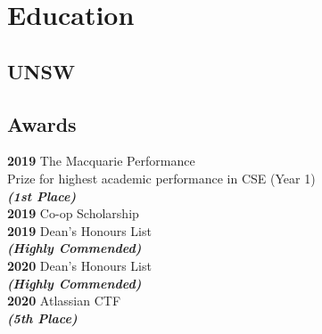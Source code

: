 \documentclass[a4paper]{deedy-resume}
\begin{document}
\begin{minipage}[t]{0.35\textwidth}


\section{Education} 

\subsection{UNSW}


\sectionspace

\subsection{Awards}

\textbf{2019}
The Macquarie Performance \\
Prize for highest academic performance
in CSE (Year 1) \\
{\footnotesize \textit{\textbf{(1st Place) }}} \\

\textbf{2019}
Co-op Scholarship \\

\textbf{2019}
Dean's Honours List \\
{\footnotesize \textit{\textbf{(Highly Commended) }}} \\

\textbf{2020}
Dean's Honours List \\
{\footnotesize \textit{\textbf{(Highly Commended) }}} \\

\textbf{2020}
Atlassian CTF \\
{\footnotesize \textit{\textbf{(5th Place) }}} \\

\sectionspace


\end{minipage}
\end{document}
